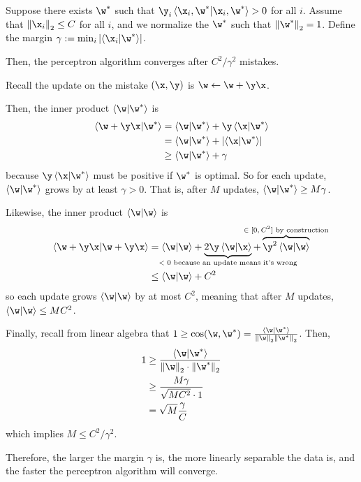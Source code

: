 \documentclass[class=cs480,notes,tikz]{agony}
\begin{document}
\begin{theorem}
  Suppose there exists $\w^*$ such that $\y_i\ip{\x_i,\w^*} > 0$ for all $i$.
  Assume that $\norm{\x_i}_2 \leq C$ for all $i$, and we normalize the $\w^*$
  such that $\norm{\w^*}_2 = 1$.
  Define the margin $\gamma := \min_i\abs{\ip{\x_i}{\w^*}}$.

  Then, the perceptron algorithm converges after $C^2/\gamma^2$ mistakes.
\end{theorem}
\begin{prf}
  Recall the update on the mistake $(\x,\y)$ is $\w \gets \w + \y\x$.

  Then, the inner product $\ip{\w}{\w^*}$ is
  \begin{align*}
    \ip{\w+\y\x}{\w^*} & = \ip{\w}{\w^*} + \y\ip{\x}{\w^*}     \\
                       & = \ip{\w}{\w^*} + \abs{\ip{\x}{\w^*}} \\
                       & \geq \ip{\w}{\w^*} + \gamma
  \end{align*}
  because $\y\ip{\x}{\w^*}$ must be positive if $\w^*$ is optimal.
  So for each update, $\ip{\w}{\w^*}$ grows by at least $\gamma > 0$.
  That is, after $M$ updates, $\ip{\w}{\w^*} \geq M\gamma$.

  Likewise, the inner product $\ip{\w}$ is
  \begin{align*}
    \ip{\w+\y\x} & = \ip{\w}
    + \underbrace{2\y\ip{\w}{\x}}_{\mathclap{\text{$<0$ because an update means it's wrong}}}
    + \overbrace{\y^2\ip{\w}}^{\mathclap{\text{$\in [0,C^2]$ by construction}}} \\
                 & \leq \ip{\w} + C^2
  \end{align*}
  so each update grows $\ip{\w}$ by at most $C^2$,
  meaning that after $M$ updates, $\ip{\w} \leq MC^2$.

  Finally, recall from linear algebra that
  $1 \geq \cos(\w,\w^*) = \frac{\ip{\w}{\w^*}}{\norm{\w}_2\norm{\w^*}_2}$.
  Then,
  \begin{align*}
    1 & \geq \frac{\ip{\w}{\w^*}}{\norm{\w}_2 \cdot \norm{\w^*}_2} \\
      & \geq \frac{M\gamma}{\sqrt{MC^2} \cdot 1}                   \\
      & = \sqrt{M}\frac{\gamma}{C}
  \end{align*}
  which implies $M \leq C^2/\gamma^2$.
\end{prf}

Therefore, the larger the margin $\gamma$ is, the more linearly separable the data is,
and the faster the perceptron algorithm will converge.
\end{document}
